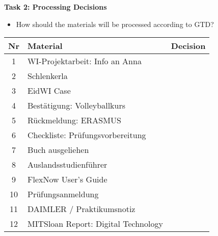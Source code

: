 \documentclass[11pt]{scrartcl}
\theoremstyle{aufgabenstyle}
\begin{document}
\newpage
\textbf{\large{Task 2: Processing Decisions}}

\begin{itemize}
	\item How should the materials will be processed according to GTD? 
\end{itemize}

\renewcommand{\arraystretch}{1.5} 
\begin{table}[htbp]
	\centering
	\begin{tabular}{|c|p{6cm}|p{8cm}|}
		\hline
		\textbf{Nr} & \textbf{Material} & \textbf{Decision} \\ \hline
		1  & WI-Projektarbeit: Info an Anna                    &  \\ \hline
		2  & Schlenkerla                                        &  \\ \hline
		3  & EidWI Case                                         &  \\ \hline
		4  & Bestätigung: Volleyballkurs                        &  \\ \hline
		5  & Rückmeldung: ERASMUS                               &  \\ \hline
		6  & Checkliste: Prüfungsvorbereitung                  &  \\ \hline
		7  & Buch ausgeliehen                                   &  \\ \hline
		8  & Auslandsstudienführer                              &  \\ \hline
		9  & FlexNow User’s Guide                               &  \\ \hline
		10 & Prüfungsanmeldung                                  &  \\ \hline
		11 & DAIMLER / Praktikumsnotiz                          &  \\ \hline
		12 & MITSloan Report: Digital Technology       &  \\ \hline
	\end{tabular}
\end{table}
\end{document}
